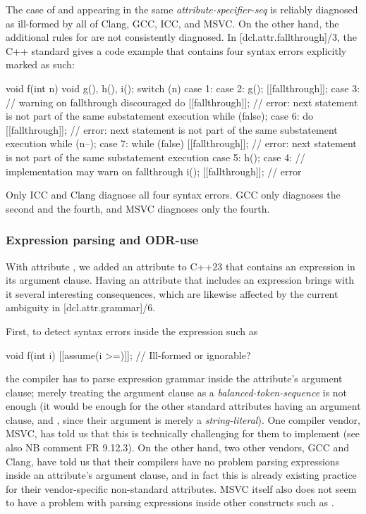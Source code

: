 The case of  and  appearing in the same \emph{attribute-specifier-seq} is reliably diagnosed as ill-formed by all of Clang, GCC, ICC, and MSVC. On the other hand, the additional rules for  are not consistently diagnosed. In [dcl.attr.fallthrough]/3, the C++ standard gives a code example that contains four syntax errors explicitly marked as such:
\begin{codeblock}
void f(int n) {
  void g(), h(), i();
  switch (n) {
  case 1:
  case 2:
    g();
    [[fallthrough]];
  case 3:                 // warning on fallthrough discouraged
    do {
      [[fallthrough]];    // error: next statement is not part of the same substatement execution
    } while (false);
  case 6:
    do {
      [[fallthrough]];    // error: next statement is not part of the same substatement execution
    } while (n--);
  case 7:
    while (false) {
      [[fallthrough]];    // error: next statement is not part of the same substatement execution
    }
  case 5:
    h();
  case 4:                 // implementation may warn on fallthrough
    i();
    [[fallthrough]];      // error
  }
}
\end{codeblock}

Only ICC and Clang diagnose all four syntax errors. GCC only diagnoses the second and the fourth, and MSVC diagnoses only the fourth.

\subsubsection{Expression parsing and ODR-use}
\label{subsubsec:odruse}

With attribute  \cite{P1774R8}, we added an attribute to C++23 that contains an expression in its argument clause. Having an attribute that includes an expression brings with it several interesting consequences, which are likewise affected by the current ambiguity in [dcl.attr.grammar]/6.

First, to detect syntax errors inside the expression such as
\begin{codeblock}
void f(int i) {
  [[assume(i >=)]];  // Ill-formed or ignorable?
}
\end{codeblock}
the compiler has to parse expression grammar inside the attribute's argument clause; merely treating the argument clause as a \emph{balanced-token-sequence} is not enough (it would be enough for the other standard attributes having an argument clause,  and , since their argument is merely a \emph{string-literal}). One compiler vendor, MSVC, has told us that this is technically challenging for them to implement (see also NB comment FR 9.12.3). On the other hand, two other vendors, GCC and Clang, have told us that their compilers have no problem parsing expressions inside an attribute's argument clause, and in fact this is already existing practice for their vendor-specific non-standard attributes. MSVC itself also does not seem to have a problem with parsing expressions inside other constructs such as .

